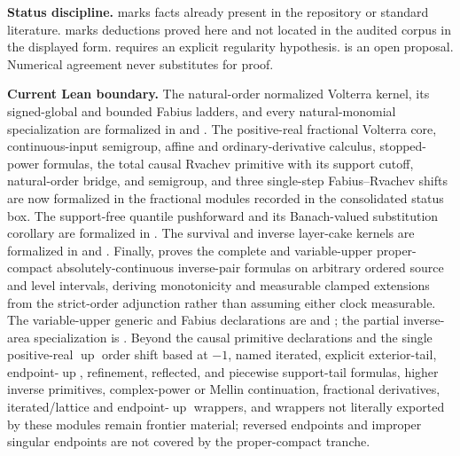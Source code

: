 \documentclass[11pt,oneside]{article}
\theoremstyle{definition}
\theoremstyle{remark}
\newcommand{\Up}{\operatorname{up}}
\newcommand{\1}{\mathbf 1}
\begin{document}
\begin{statusbox}
\textbf{Status discipline.}
\statusbackground{} marks facts already present in the repository or standard
literature.  \statusprovedPartll{} marks deductions proved here and not located in the
audited corpus in the displayed form.  \statusconditional{} requires an explicit
regularity hypothesis.  \statusconjecture{} is an open proposal.  Numerical
agreement never substitutes for proof.
\end{statusbox}

\begin{statusbox}
\textbf{Current Lean boundary.}
The natural-order normalized Volterra kernel, its signed-global and bounded
Fabius ladders, and every natural-monomial specialization are formalized in
 and .
The positive-real fractional Volterra core, continuous-input semigroup, affine and
ordinary-derivative calculus, stopped-power formulas, the total causal Rvachev primitive
with its support cutoff, natural-order bridge, and semigroup, and three single-step
Fabius--Rvachev shifts are now formalized in the fractional modules recorded in the
consolidated status box.
The support-free quantile pushforward and its Banach-valued substitution
corollary are formalized in .  The survival and inverse
layer-cake kernels are formalized in  and
.  Finally,  proves the
complete and variable-upper proper-compact absolutely-continuous inverse-pair formulas on
arbitrary ordered source and level intervals, deriving monotonicity and measurable clamped
extensions from the strict-order adjunction rather than assuming either clock measurable.
The variable-upper generic and Fabius declarations are
 and
; the partial
inverse-area specialization is
.  Beyond the
causal primitive declarations and the single positive-real \(\Up\) order shift based at
\(-1\), named iterated, explicit exterior-tail, endpoint-\(\Up\), refinement, reflected,
and piecewise support-tail formulas,
higher inverse primitives, complex-power or Mellin
continuation, fractional derivatives, iterated/lattice and endpoint-\(\Up\) wrappers, and
wrappers not literally exported by these modules remain frontier material; reversed
endpoints and improper singular endpoints are not covered by the proper-compact tranche.
\end{statusbox}
\end{document}
